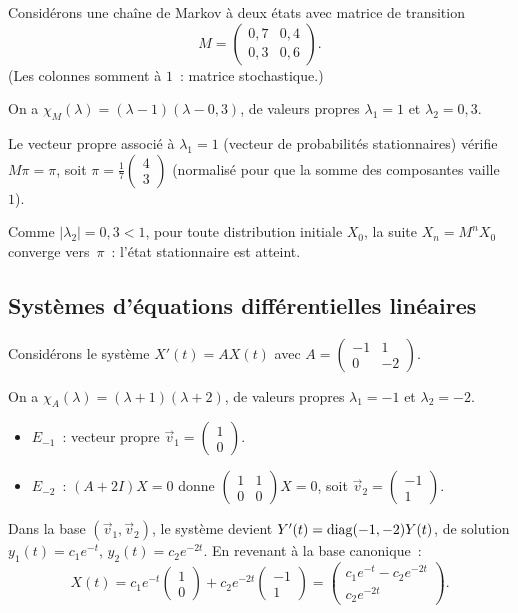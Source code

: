 Considérons une chaîne de Markov à deux états avec matrice de transition
\[
  M=\begin{pmatrix}0{,}7&0{,}4\\0{,}3&0{,}6\end{pmatrix}.
\]
(Les colonnes somment à $1$~: matrice stochastique.)

On a $\chi_M(\lambda)=(\lambda-1)(\lambda-0{,}3)$, de valeurs propres
$\lambda_1=1$ et $\lambda_2=0{,}3$.

Le vecteur propre associé à $\lambda_1=1$ (vecteur de probabilités
stationnaires) vérifie $M\pi=\pi$, soit
$\pi=\frac{1}{7}\begin{pmatrix}4\\3\end{pmatrix}$ (normalisé pour
que la somme des composantes vaille~$1$).

Comme $|\lambda_2|=0{,}3<1$, pour toute distribution initiale
$X_0$, la suite $X_n=M^n X_0$ converge vers~$\pi$~:
l'état stationnaire est atteint.

\subsection{Systèmes d'équations différentielles linéaires}\label{subsec:edo}

Considérons le système $X'(t)=AX(t)$ avec
$A=\begin{pmatrix}-1&1\\0&-2\end{pmatrix}$.

On a $\chi_A(\lambda)=(\lambda+1)(\lambda+2)$, de valeurs propres
$\lambda_1=-1$ et $\lambda_2=-2$.
\begin{itemize}
  \item $E_{-1}$~: vecteur propre
    $\vec{v}_1=\begin{pmatrix}1\\0\end{pmatrix}$.
  \item $E_{-2}$~: $(A+2I)X=0$ donne
    $\begin{pmatrix}1&1\\0&0\end{pmatrix}X=0$, soit
    $\vec{v}_2=\begin{pmatrix}-1\\1\end{pmatrix}$.
\end{itemize}

Dans la base $(\vec{v}_1,\vec{v}_2)$, le système devient
$Y'(t)=\operatorname{diag}(-1,-2)Y(t)$, de solution $y_1(t)=c_1 e^{-t}$,
$y_2(t)=c_2 e^{-2t}$. En revenant à la base canonique~:
\[
  X(t)=c_1 e^{-t}\begin{pmatrix}1\\0\end{pmatrix}
  +c_2 e^{-2t}\begin{pmatrix}-1\\1\end{pmatrix}
  =\begin{pmatrix}c_1 e^{-t}-c_2 e^{-2t}\\c_2 e^{-2t}\end{pmatrix}.
\]

